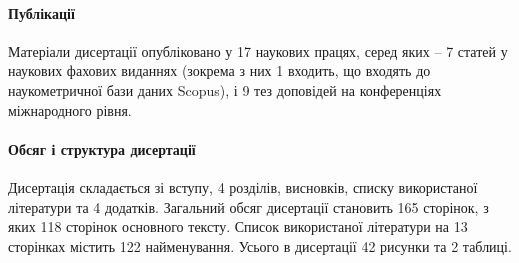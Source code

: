 \paragraph{Публікації}

Матеріали дисертації опубліковано у 17 наукових працях, серед яких -- 7
статей у наукових фахових виданнях (зокрема з них 1 входить, що входять 
до наукометричної бази даних Scopus), і 9 тез доповідей на конференціях 
міжнародного рівня.

\paragraph{Обсяг і структура дисертації}

Дисертація складається зі вступу, 4 розділів, висновків, списку використаної 
літератури та 4 додатків. Загальний обсяг дисертації становить 165 сторінок, 
з яких 118 сторінок основного тексту. Список використаної літератури на 13 
сторінках містить 122 найменування. Усього в дисертації 42 рисунки та 
2 таблиці.








